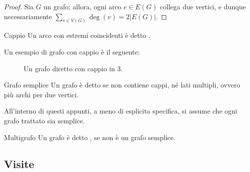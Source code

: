 \documentclass[a4paper, 12pt]{report}
\begin{document}
    \begin{proof}
        Sia $G$ un grafo; allora, ogni arco $e \in E(G)$ collega due vertici, e dunque necessariamente $\displaystyle \sum_{v \in V(G)}{\deg(v)} = 2 |E(G)|$.
    \end{proof}

    \begin{frameddefn}{Cappio}
        Un arco con estremi coincidenti è detto .
    \end{frameddefn}

    \begin{example}
        Un esempio di grafo con cappio è il seguente:

        \begin{figure}[H]
            \centering
            \caption{Un grafo diretto con cappio in 3.}
        \end{figure}
    \end{example}

    \begin{frameddefn}{Grafo semplice}
        Un grafo è detto  se non contiene cappi, né lati multipli, ovvero più archi per due vertici.

        All'interno di questi appunti, a meno di esplicita specifica, si assume che ogni grafo trattato sia semplice.
    \end{frameddefn}

    \begin{frameddefn}{Multigrafo}
        Un grafo è detto , se non è un grafo semplice.
    \end{frameddefn}

    \subsection{Visite}
\end{document}
